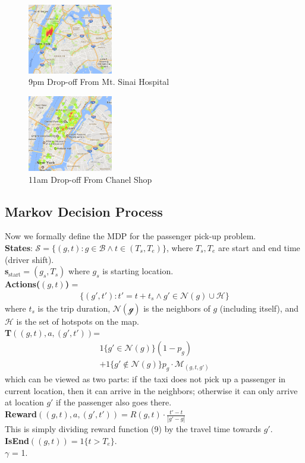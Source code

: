 \documentclass[letterpaper, 10 pt, conference]{ieeeconf}
\begin{document}
\begin{figure}
\centering
\includegraphics[width=0.33\textwidth]{9-MtSinaiHospital.png}
\caption{9pm Drop-off From Mt. Sinai Hospital}
\end{figure}
\begin{figure}
\centering
\includegraphics[width=0.33\textwidth]{11-chanel-shop.png}
\caption{11am Drop-off From Chanel Shop}
\end{figure}
\subsection{Markov Decision Process}
Now we formally define the MDP for the passenger pick-up problem.\\
\textbf{States}: $\mathcal{S} = \{(g, t): g\in\mathcal{B}\wedge t\in(T_s, T_e)\}$, where $T_s, T_e$ are start and end time (driver shift).\\
\textbf{s$_{\text{start}}$}$=(g_s, T_s)$ where $g_s$ is starting location.\\
\textbf{Actions($(g, t)$)} =
\begin{align}
\{(g', t'):t'= t+t_s\wedge g'\in\mathcal{N}(g)\cup\mathcal{H}\}
\end{align}
where $t_s$ is the trip duration, $\mathcal{N(g)}$ is the neighbors of $g$ (including itself), and $\mathcal{H}$ is the set of hotspots on the map.\\
\textbf{T$((g,t), a, (g',t'))$}=
\begin{align}
1\{g'\in\mathcal{N}(g)\}(1-p_g)\\
+1\{g'\not\in\mathcal{N}(g)\}p_g\cdot\mathcal{M}_{(g,t,g')}
\end{align}
which can be viewed as two parts: if the taxi does not pick up a passenger in current location, then it can arrive in the neighbors; otherwise it can only arrive at location $g'$ if the passenger also goes there.\\
\textbf{Reward}$((g,t), a, (g',t'))=R(g,t)\cdot\frac{t'-t}{|g'-g|}$\\
This is simply dividing reward function (9) by the travel time towards $g'$.\\
\textbf{IsEnd}$((g,t))=1\{t>T_e\}$.\\
\textbf{$\gamma$} = 1.
\end{document}
